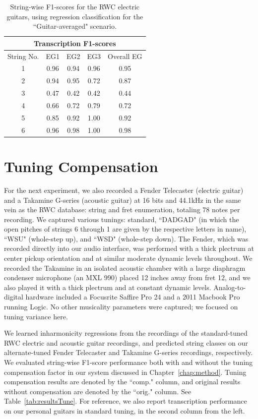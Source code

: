 \documentclass[12pt]{cmuthesis}
\begin{document}
\begin{table}[!htbp]
\begin{center}
\begin{tabular}{||c||c|c|c|c||}
\hline
\multicolumn{5}{||c||}{\bf{Transcription F1-scores}} \\
\hline
String No. & EG1 & EG2 & EG3 & Overall EG\\
\hline
1 & 0.96 & 0.94 & 0.96 & 0.95 \\
\hline
2 & 0.94 & 0.95 & 0.72 & 0.87\\
\hline
3 & 0.47 & 0.42 & 0.42 &  0.44\\
\hline
4 & 0.66 & 0.72 & 0.79 &  0.72\\
\hline
5 & 0.85 & 0.92 & 1.00 &  0.92 \\
\hline
6 & 0.96 & 0.98 & 1.00 &  0.98 \\ 
\hline
\hline
\end{tabular}
\caption{String-wise F1-scores for the RWC electric guitars, using regression classification for the ``Guitar-averaged" scenario.} 
\label{tab:eg-str-f}
\end{center}
\end{table}

\section{Tuning Compensation}
For the next experiment, we also recorded a Fender Telecaster (electric guitar) and a Takamine G-series (acoustic guitar) at 16 bits and 44.1kHz in the same vein as the RWC database: string and fret enumeration, totaling 78 notes per recording. We captured various tunings: standard, ``DADGAD" (in which the open pitches of strings 6 through 1 are given by the respective letters in name), ``WSU" (whole-step up), and ``WSD" (whole-step down). The Fender, which was recorded directly into our audio interface, was performed with a thick plectrum at center pickup orientation and at similar moderate dynamic levels throughout. We recorded the Takamine in an isolated acoustic chamber with a large diaphragm condenser microphone (an MXL 990) placed 12 inches away from fret 12, and we also played it with a thick plectrum and at constant dynamic levels. Analog-to-digital hardware included a Focusrite Saffire Pro 24 and a 2011 Macbook Pro running Logic. No other musicality parameters were captured; we focused on tuning variance here.

We learned inharmonicity regressions from the recordings of the standard-tuned RWC electric and acoustic guitar recordings, and predicted string classes on our alternate-tuned Fender Telecaster and Takamine G-series recordings, respectively. We evaluated string-wise F1-score performance both with and without the tuning compensation factor in our system discussed in Chapter~\ref{chap:method}. Tuning compensation results are denoted by the ``comp." column, and original results without compensation are denoted by the ``orig." column. See Table~\ref{tab:resultsTune}. For reference, we also report transcription performance on our personal guitars in standard tuning, in the second column from the left.
\end{document}

